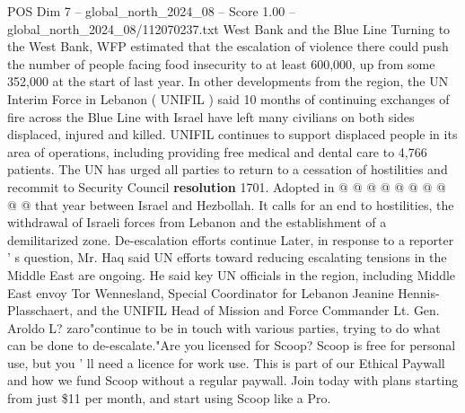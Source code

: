 \begin{textsample}{POS Dim 7 – global\_north\_2024\_08 – Score 1.00 – global\_north\_2024\_08/112070237.txt}
West Bank and the Blue Line Turning to the West Bank, WFP estimated that the escalation of violence there could push the number of people facing food insecurity to at least 600,000, up from some 352,000 at the start of last year.
In other developments from the region, the UN Interim Force in Lebanon ( UNIFIL ) said 10 months of continuing exchanges of fire across the Blue Line with Israel have left many civilians on both sides displaced, injured and killed.
UNIFIL continues to support displaced people in its area of operations, including providing free medical and dental care to 4,766 patients.
The UN has urged all parties to return to a cessation of hostilities and recommit to Security Council \textbf{resolution} 1701.
Adopted in @ @ @ @ @ @ @ @ @ @ that year between Israel and Hezbollah.
It calls for an end to hostilities, the withdrawal of Israeli forces from Lebanon and the establishment of a demilitarized zone.
De-escalation efforts continue Later, in response to a reporter ' s question, Mr.
Haq said UN efforts toward reducing escalating tensions in the Middle East are ongoing.
He said key UN officials in the region, including Middle East envoy Tor Wennesland, Special Coordinator for Lebanon Jeanine Hennis-Plasschaert, and the UNIFIL Head of Mission and Force Commander Lt.
Gen.
Aroldo L? zaro"continue to be in touch with various parties, trying to do what can be done to de-escalate."Are you licensed for Scoop?
Scoop is free for personal use, but you ' ll need a licence for work use.
This is part of our Ethical Paywall and how we fund Scoop without a regular paywall.
Join today with plans starting from just \$11 per month, and start using Scoop like a Pro.

\end{textsample}
